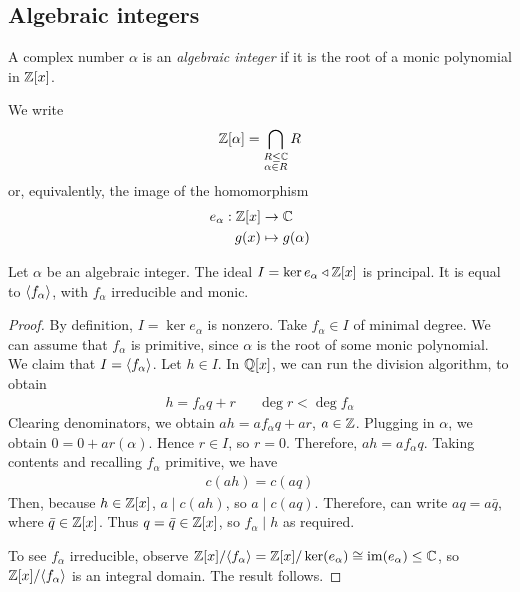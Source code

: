 \documentclass{../../template/note}
\begin{document}
    \subsection{Algebraic integers}

    \begin{definition}
        A complex number $\alpha$ is an \emph{algebraic integer} if it is the root of a monic polynomial in $\mathbb Z[x]$.
    \end{definition}
    
    We write
    \begin{align*}
        \mathbb Z[\alpha] = \bigcap_{\substack{R \leq \mathbb C \\ \alpha \in R}} R
    \end{align*}
    or, equivalently, the image of the homomorphism
    \begin{align*}
        e_\alpha: \mathbb Z[x] &\to \mathbb C \\
        g(x) &\mapsto g(\alpha)
    \end{align*}
    
    \begin{proposition}
        Let $\alpha$ be an algebraic integer. The ideal $I = \ker e_\alpha \triangleleft \mathbb Z[x]$ is principal. It is equal to $\left \langle f_\alpha \right \rangle$, with $f_\alpha$ irreducible and monic.
    \end{proposition}
    
    \begin{proof}
        By definition, $I = \ker e_\alpha$ is nonzero. Take $f_\alpha \in I$ of minimal degree. We can assume that $f_\alpha$ is primitive, since $\alpha$ is the root of some monic polynomial. We claim that $I=\left \langle f_\alpha \right \rangle$. Let $h \in I$. In $\mathbb Q[x]$, we can run the division algorithm, to obtain
        \begin{align*}
            h = f_\alpha q + r && \deg r < \deg f_\alpha
        \end{align*}
        Clearing denominators, we obtain $ah = af_\alpha q + ar$, $a \in \mathbb Z$. Plugging in $\alpha$, we obtain $0 = 0 + ar(\alpha)$. Hence $r \in I$, so $r=0$. Therefore, $ah = af_\alpha q$. Taking contents and recalling $f_\alpha$ primitive, we have
        \begin{align*}
            c(ah) = c(aq)
        \end{align*}
        Then, because $h \in \mathbb Z[x]$, $a \mid c(ah)$, so $a \mid c(aq)$. Therefore, can write $aq = a \bar q$, where $\bar q \in \mathbb Z[x]$. Thus $q = \bar q \in \mathbb Z[x]$, so $f_\alpha \mid h$ as required.       
        
        To see $f_\alpha$ irreducible, observe $\mathbb Z[x]/\!\left \langle f_\alpha \right \rangle = \mathbb Z[x]/\ker(e_\alpha) \cong \operatorname{im}(e_\alpha) \leq \mathbb C$, so $\mathbb Z[x]/\!\left \langle f_\alpha \right \rangle$ is an integral domain. The result follows. 
    \end{proof}
    
\end{document}
